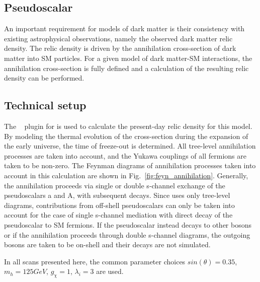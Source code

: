 \subsection{Pseudoscalar}

An important requirement for models of dark matter is their consistency with existing astrophysical observations, namely the observed dark matter relic density.
The relic density is driven by the annihilation cross-section of dark matter into SM particles.
For a given model of dark matter-SM interactions, the annihilation cross-section is fully defined and a calculation of the resulting relic density can be performed. 

\subsection{Technical setup}
The \maddm~\cite{Backovic:2013dpa,Backovic:2015cra} plugin for \mgamcnlo is used to calculate the present-day relic density for this model.
By modeling the thermal evolution of the cross-section during the expansion of the early universe, the time of freeze-out is determined.
All tree-level annihilation processes are taken into account, and the Yukawa couplings of all fermions are taken to be non-zero.
The Feynman diagrams of annihilation processes taken into account in this calculation are shown in Fig.~\ref{fig:feyn_annihilation}. Generally, the annihilation proceeds via single or double s-channel exchange of the pseudoscalars a and A, with subsequent decays. Since \maddm uses only tree-level diagrams, contributions from off-shell pseudoscalars can only be taken into account for the case of single s-channel mediation with direct decay of the pseudoscalar to SM fermions. If the pseudoscalar instead decays to other bosons or if the annihilation proceeds through double s-channel diagrams, the outgoing bosons are taken to be on-shell and their decays are not simulated. 

In all scans presented here, the common parameter choices $sin(\theta)=0.35$, $m_{h} = 125 GeV$, $g_{\chi}=1$, $\lambda_i = 3$ are used.

